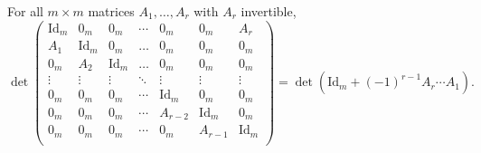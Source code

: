 \documentclass[10pt,a4paper]{amsart}
\begin{document}
\begin{lem}\label{det lem}
    For all $m\times m$ matrices $A_1,\ldots, A_r$ with $A_r$ invertible, 
    $$\det \begin{pmatrix}
        \mathrm{Id}_m & 0_m & 0_m & \cdots & 0_m &0_m &A_r \\
       A_1 & \mathrm{Id}_m & 0_m & \ldots & 0_m & 0_m & 0_m \\
        0_m & A_2 & \mathrm{Id}_m & \ldots & 0_m & 0_m &0_m \\
        \vdots & \vdots & \vdots & \ddots & \vdots & \vdots & \vdots \\
         0_m & 0_m & 0_m&  \cdots & \mathrm{Id}_m &  0_m  & 0_m\\
         0_m & 0_m & 0_m& \cdots & A_{r-2} &  \mathrm{Id}_m  & 0_m\\
        0_m & 0_m & 0_m & \cdots & 0_m & A_{r-1} & \mathrm{Id}_m \\
    \end{pmatrix} = \det\left( \mathrm{Id}_m + (-1)^{r-1}A_r\cdots A_1 \right).$$
\end{lem}
\end{document}
